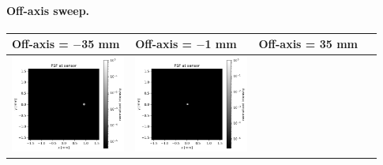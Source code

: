 \documentclass[11pt,a4paper]{article}
\begin{document}
	\paragraph{Off-axis sweep.}%
	\begin{table}[H]
		\centering
		\begin{tabular}{>{\centering\arraybackslash}m{0.31\linewidth} >{\centering\arraybackslash}m{0.31\linewidth} >{\centering\arraybackslash}m{0.31\linewidth}}
			\toprule
			Off-axis = \(-\)35 mm & Off-axis = \(-\)1 mm & Off-axis = 35 mm \\
			\midrule
			\includegraphics[width=\linewidth,keepaspectratio]{offaxis/biconvex_psf_-35.00_log.png} &
			\includegraphics[width=\linewidth,keepaspectratio]{offaxis/biconvex_psf_-1.00_log.png} &

\end{tabular}
\end{table}
\end{document}
